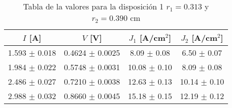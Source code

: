 \begin{table}[H]
    \centering
\begin{tabular}{cccc}
\toprule
$I$ [A] & $V$ [V] & $J_1$ [A/cm$^2$] & $J_2$ [A/cm$^2$] \\
\midrule
1.593 $\pm$ 0.018 & 0.4624 $\pm$ 0.0025 & 8.09 $\pm$ 0.08 & 6.50 $\pm$ 0.07 \\
1.984 $\pm$ 0.022 & 0.5748 $\pm$ 0.0031 & 10.08 $\pm$ 0.10 & 8.09 $\pm$ 0.08 \\
2.486 $\pm$ 0.027 & 0.7210 $\pm$ 0.0038 & 12.63 $\pm$ 0.13 & 10.14 $\pm$ 0.10 \\
2.988 $\pm$ 0.032 & 0.8660 $\pm$ 0.0045 & 15.18 $\pm$ 0.15 & 12.19 $\pm$ 0.12 \\
\bottomrule
\end{tabular}
    \caption{Tabla de la valores para la disposición 1 $r_1=0.313$ y $r_2= 0.390 $ cm }
    \label{Tab:VIJ_1}
\end{table}
